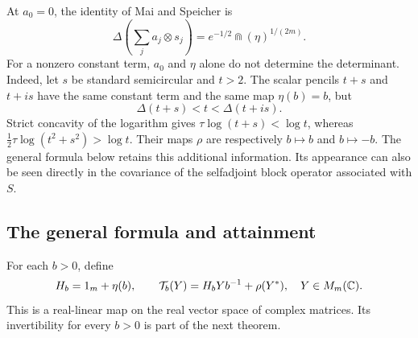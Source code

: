 At $a_0=0$, the identity of Mai and Speicher is
\begin{equation}\label{eq:centered-capacity}
 \Delta\left(\sum_j a_j\otimes s_j\right)
       =e^{-1/2}\Cap(\eta)^{1/(2m)}.
\end{equation}
For a nonzero constant term, $a_0$ and $\eta$ alone do not determine the determinant.
Indeed, let $s$ be standard semicircular and $t>2$.
The scalar pencils $t+s$ and $t+is$ have the same constant term and the same map $\eta(b)=b$, but
\begin{equation}\label{eq:phase-obstruction}
 \Delta(t+s)<t<\Delta(t+is).
\end{equation}
Strict concavity of the logarithm gives $\tau\log(t+s)<\log t$, whereas $\tfrac12\tau\log(t^2+s^2)>\log t$.
Their maps $\rho$ are respectively $b\mapsto b$ and $b\mapsto-b$.
The general formula below retains this additional information.
Its appearance can also be seen directly in the covariance of the selfadjoint block operator associated with $S$.

\subsection{The general formula and attainment}
For each $b>0$, define
\begin{equation}\label{eq:inner-map}
 H_b=1_m+\eta(b),\qquad
 \mathcal T_b(Y)=H_bYb^{-1}+\rho(Y^*),\quad Y\in M_m(\mathbb C).
\end{equation}
This is a real-linear map on the real vector space of complex matrices.
Its invertibility for every $b>0$ is part of the next theorem.

